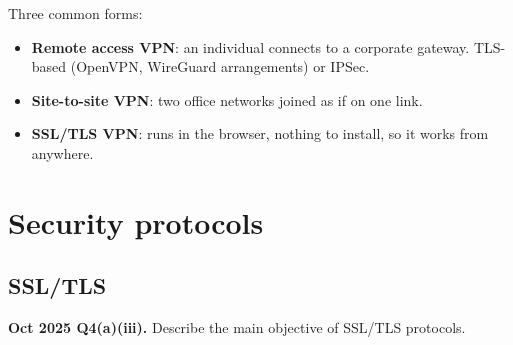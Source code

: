 \documentclass[11pt,a4paper]{article}
\begin{document}
Three common forms:
\begin{itemize}
\item \textbf{Remote access VPN}: an individual connects to a corporate gateway. TLS-based (OpenVPN, WireGuard arrangements) or IPSec.
\item \textbf{Site-to-site VPN}: two office networks joined as if on one link.
\item \textbf{SSL/TLS VPN}: runs in the browser, nothing to install, so it works from anywhere.
\end{itemize}

\section{Security protocols}

\subsection{SSL/TLS}

\begin{pyqbox}
\textbf{Oct 2025 Q4(a)(iii).} Describe the main objective of SSL/TLS protocols.
\end{pyqbox}
\end{document}
